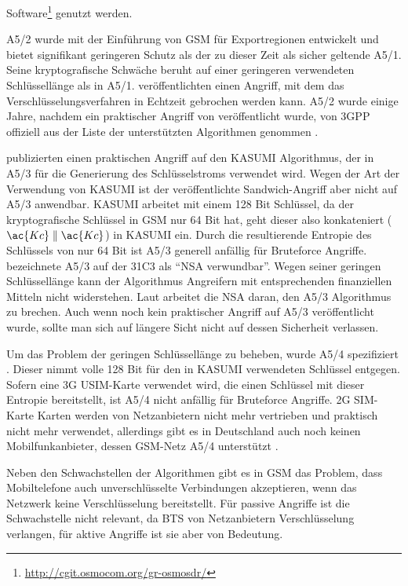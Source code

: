 Software\footnote{\url{http://cgit.osmocom.org/gr-osmosdr/}} genutzt werden.

A5/2 wurde mit der Einführung von \ac{GSM} für Exportregionen entwickelt und bietet signifikant geringeren Schutz als der zu dieser Zeit als sicher geltende A5/1. Seine kryptografische Schwäche beruht auf einer geringeren verwendeten Schlüssellänge als in A5/1. \citet{goldberg1999real} veröffentlichten einen Angriff, mit dem das Verschlüsselungsverfahren in Echtzeit gebrochen werden kann. A5/2 wurde einige Jahre, nachdem ein praktischer Angriff von \citet{barkan2003instant} veröffentlicht wurde, von \ac{3GPP} offiziell aus der Liste der unterstützten Algorithmen genommen \citep{osmocom:withdrawal-a52}.

\citet{dunkelman2010practical} publizierten einen praktischen Angriff auf den KASUMI Algorithmus, der in A5/3 für die Generierung des Schlüsselstroms verwendet wird. Wegen der Art der Verwendung von KASUMI ist der veröffentlichte Sandwich-Angriff aber nicht auf A5/3 anwendbar. KASUMI arbeitet mit einem 128 Bit Schlüssel, da der kryptografische Schlüssel in \ac{GSM} nur 64 Bit hat, geht dieser also konkateniert ($\ac{Kc} \parallel \ac{Kc}$) in KASUMI ein. Durch die resultierende Entropie des Schlüssels von nur 64 Bit ist A5/3 generell anfällig für Bruteforce Angriffe. \citet{nohl2014mobile} bezeichnete A5/3 auf der 31C3 als "`NSA verwundbar"'. Wegen seiner geringen Schlüssellänge kann der Algorithmus Angreifern mit entsprechenden finanziellen Mitteln nicht widerstehen. Laut \citet{theintercept:nsa-auroragold} arbeitet die \ac{NSA} daran, den A5/3 Algorithmus zu brechen. Auch wenn noch kein praktischer Angriff auf A5/3 veröffentlicht wurde, sollte man sich auf längere Sicht nicht auf dessen Sicherheit verlassen.
\begin{sloppypar}
Um das Problem der geringen Schlüssellänge zu beheben, wurde A5/4 spezifiziert . Dieser nimmt volle 128 Bit für den in KASUMI verwendeten Schlüssel entgegen. Sofern eine 3G \ac{USIM}-Karte verwendet wird, die einen Schlüssel mit dieser Entropie bereitstellt, ist A5/4 nicht anfällig für Bruteforce Angriffe. 2G \ac{SIM}-Karte Karten werden von Netzanbietern nicht mehr vertrieben und praktisch nicht mehr verwendet, allerdings gibt es in Deutschland auch noch keinen Mobilfunkanbieter, dessen \ac{GSM}-Netz A5/4 unterstützt \citep{gsmmap:secrep-ger}.
\end{sloppypar}
Neben den Schwachstellen der Algorithmen gibt es in \ac{GSM} das Problem, dass Mobiltelefone auch unverschlüsselte Verbindungen akzeptieren, wenn das Netzwerk keine Verschlüsselung bereitstellt. Für passive Angriffe ist die Schwachstelle nicht relevant, da \ac{BTS} von Netzanbietern Verschlüsselung verlangen, für aktive Angriffe ist sie aber von Bedeutung. 

